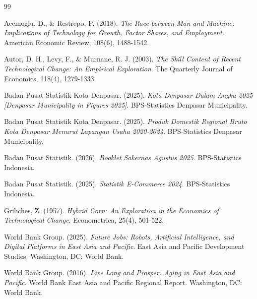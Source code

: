 \documentclass[11pt, a4paper]{article}
\begin{document}
  \newpage
  \begin{thebibliography}{99}
  
  Acemoglu, D., \& Restrepo, P. (2018). \textit{The Race between Man and Machine: Implications of Technology for Growth, Factor Shares, and Employment}. American Economic Review, 108(6), 1488-1542.
  
  Autor, D. H., Levy, F., \& Murnane, R. J. (2003). \textit{The Skill Content of Recent Technological Change: An Empirical Exploration}. The Quarterly Journal of Economics, 118(4), 1279-1333.
  
  Badan Pusat Statistik Kota Denpasar. (2025). \textit{Kota Denpasar Dalam Angka 2025 [Denpasar Municipality in Figures 2025]}. BPS-Statistics Denpasar Municipality.
  
  Badan Pusat Statistik Kota Denpasar. (2025). \textit{Produk Domestik Regional Bruto Kota Denpasar Menurut Lapangan Usaha 2020-2024}. BPS-Statistics Denpasar Municipality.
  
  Badan Pusat Statistik. (2026). \textit{Booklet Sakernas Agustus 2025}. BPS-Statistics Indonesia.
  
  Badan Pusat Statistik. (2025). \textit{Statistik E-Commerce 2024}. BPS-Statistics Indonesia.
  
  Griliches, Z. (1957). \textit{Hybrid Corn: An Exploration in the Economics of Technological Change}. Econometrica, 25(4), 501-522.
  
  World Bank Group. (2025). \textit{Future Jobs: Robots, Artificial Intelligence, and Digital Platforms in East Asia and Pacific}. East Asia and Pacific Development Studies. Washington, DC: World Bank.
  
  World Bank Group. (2016). \textit{Live Long and Prosper: Aging in East Asia and Pacific}. World Bank East Asia and Pacific Regional Report. Washington, DC: World Bank.
  
  \end{thebibliography}
  
  
\end{document}
